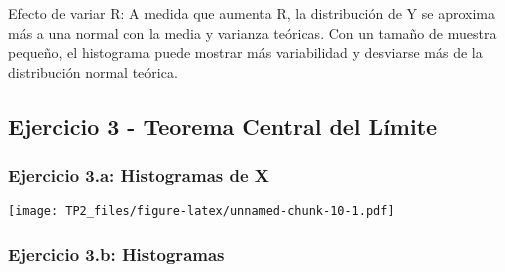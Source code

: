 \documentclass[
]{article}
\begin{document}
Efecto de variar R: A medida que aumenta R, la distribución de Y se
aproxima más a una normal con la media y varianza teóricas. Con un
tamaño de muestra pequeño, el histograma puede mostrar más variabilidad
y desviarse más de la distribución normal teórica.

\subsection{Ejercicio 3 - Teorema Central del
Límite}\label{ejercicio-3---teorema-central-del-luxedmite}

\subsubsection{Ejercicio 3.a: Histogramas de
X}\label{ejercicio-3.a-histogramas-de-x}

\texttt{[image: TP2\_files/figure-latex/unnamed-chunk-10-1.pdf]}

\subsubsection{Ejercicio 3.b:
Histogramas}\label{ejercicio-3.b-histogramas}
\end{document}
